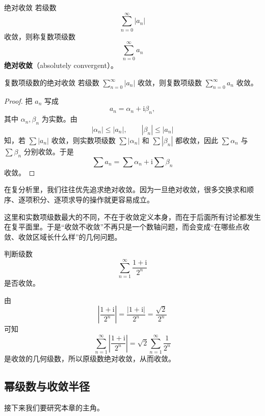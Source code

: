 \begin{dingliyi}{绝对收敛}{}
若级数
\[
    \sum_{n=0}^{\infty} |a_n|
\]
收敛，则称复数项级数
\[
    \sum_{n=0}^{\infty} a_n
\]
\textbf{绝对收敛}（absolutely convergent）。
\end{dingliyi}

\begin{dingli}{复数项级数的绝对收敛}{}
若级数 $\sum_{n=0}^{\infty} |a_n|$ 收敛，则复数项级数 $\sum_{n=0}^{\infty} a_n$ 收敛。
\end{dingli}

\begin{proof}
把 $a_n$ 写成
\[
    a_n = \alpha_n + \mathrm{i}\beta_n,
\]
其中 $\alpha_n,\beta_n$ 为实数。由
\[
    |\alpha_n| \le |a_n|,\qquad |\beta_n| \le |a_n|
\]
知，若 $\sum |a_n|$ 收敛，则实数项级数 $\sum |\alpha_n|$ 和 $\sum |\beta_n|$ 都收敛，因此 $\sum \alpha_n$ 与 $\sum \beta_n$ 分别收敛。于是
\[
    \sum a_n = \sum \alpha_n + \mathrm{i}\sum \beta_n
\]
收敛。
\end{proof}

\begin{zhu}{}{}
在复分析里，我们往往优先追求绝对收敛。因为一旦绝对收敛，很多交换求和顺序、逐项积分、逐项求导的操作就更容易成立。
\end{zhu}

\begin{zhu}{}{}
这里和实数项级数最大的不同，不在于收敛定义本身，而在于后面所有讨论都发生在复平面里。于是``收敛不收敛''不再只是一个数轴问题，而会变成``在哪些点收敛、收敛区域长什么样''的几何问题。
\end{zhu}

\begin{lizi}{}{}
判断级数
\[
    \sum_{n=1}^{\infty} \frac{1+\mathrm{i}}{2^n}
\]
是否收敛。

\begin{jie}
由
\[
    \left|\frac{1+\mathrm{i}}{2^n}\right| = \frac{|1+\mathrm{i}|}{2^n} = \frac{\sqrt{2}}{2^n}
\]
可知
\[
    \sum_{n=1}^{\infty} \left|\frac{1+\mathrm{i}}{2^n}\right|
    = \sqrt{2}\sum_{n=1}^{\infty} \frac{1}{2^n}
\]
是收敛的几何级数，所以原级数绝对收敛，从而收敛。
\end{jie}
\end{lizi}

\subsection{幂级数与收敛半径}

接下来我们要研究本章的主角。


